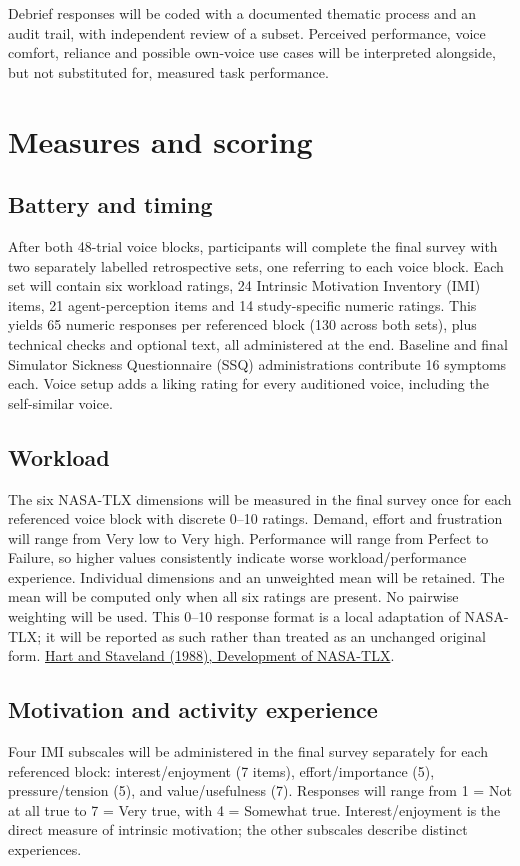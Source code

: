 \documentclass[11pt,letterpaper]{article}
\begin{document}
Debrief responses will be coded with a documented thematic process and an audit trail, with independent review of a subset. Perceived performance, voice comfort, reliance and possible own-voice use cases will be interpreted alongside, but not substituted for, measured task performance.
\section{Measures and scoring}
\subsection{Battery and timing}
After both 48-trial voice blocks, participants will complete the final survey with two separately labelled retrospective sets, one referring to each voice block. Each set will contain six workload ratings, 24 Intrinsic Motivation Inventory (IMI) items, 21 agent-perception items and 14 study-specific numeric ratings. This yields 65 numeric responses per referenced block (130 across both sets), plus technical checks and optional text, all administered at the end. Baseline and final Simulator Sickness Questionnaire (SSQ) administrations contribute 16 symptoms each. Voice setup adds a liking rating for every auditioned voice, including the self-similar voice.

\subsection{Workload}
The six NASA-TLX dimensions will be measured in the final survey once for each referenced voice block with discrete 0--10 ratings. Demand, effort and frustration will range from Very low to Very high. Performance will range from Perfect to Failure, so higher values consistently indicate worse workload/performance experience. Individual dimensions and an unweighted mean will be retained. The mean will be computed only when all six ratings are present. No pairwise weighting will be used. This 0--10 response format is a local adaptation of NASA-TLX; it will be reported as such rather than treated as an unchanged original form.
\href{https://doi.org/10.1016/S0166-4115(08)62386-9}{Hart and Staveland (1988), Development of NASA-TLX}.

\subsection{Motivation and activity experience}
Four IMI subscales will be administered in the final survey separately for each referenced block: interest/enjoyment (7 items), effort/importance (5), pressure/tension (5), and value/usefulness (7). Responses will range from 1 = Not at all true to 7 = Very true, with 4 = Somewhat true. Interest/enjoyment is the direct measure of intrinsic motivation; the other subscales describe distinct experiences.
\end{document}
